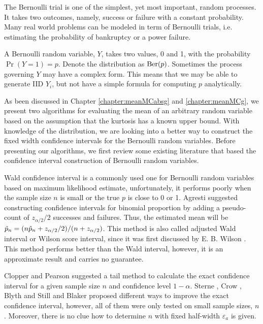 \documentclass{iitthesis}
\theoremstyle{definition}
\begin{document}
The Bernoulli trial is one of the simplest, yet most important, random processes. It takes two outcomes, namely, success or failure with a constant probability. Many real world problems can be modeled in term of Bernoulli trials, i.e. estimating the probability of bankruptcy or a power failure.

 A Bernoulli random variable, $Y$, takes two values, 0 and 1, with the probability $\Pr(Y=1) = p$. Denote the distribution as $ \operatorname{Ber}(p)$. Sometimes the process governing $Y$ may have a complex form. This means that we may be able to generate IID $Y_i$, but not have a simple formula for computing $p$ analytically. 

As been discussed in Chapter \ref{chapter:meanMCabsg} and \ref{chapter:meanMCg}, we present two algorithms for evaluating the mean of an arbitrary random variable based on the assumption that the kurtosis has a known upper bound. With knowledge of the distribution, we are looking into a better way to construct the fixed width confidence intervals for the Bernoulli random variables. Before presenting our algorithms, we first review some existing literature that based the confidence interval construction of Bernoulli random variables.

Wald confidence interval \cite[Section 1.3.3]{Agresti02} is a commonly used one for Bernoulli random variables based on maximum likelihood estimate, unfortunately, it performs poorly when the sample size $n$ is small or the true $p$ is close to 0 or 1. Agresti \cite[Section 1.4.2]{Agresti02} suggested constructing confidence intervals for binomial proportion by adding a pseudo-count of $z_{\alpha/2}/2$ successes and failures. Thus, the estimated mean will be $\tilde{p}_n =(n\hat{p}_n+z_{\alpha/2}/2) / (n+z_{\alpha/2})$. This method is also called adjusted Wald interval or Wilson score interval, since it was first discussed by E. B. Wilson \cite{wilson27}. This method performs better than the Wald interval, however, it is an approximate result and carries no guarantee.

Clopper and Pearson \cite{CP34} suggested a tail method to calculate the exact confidence interval for a given sample size $n$ and confidence level $1-\alpha$. Sterne \cite{sterne54}, Crow \cite{crow56}, Blyth and Still \cite{BS83} and Blaker \cite{Blaker00} proposed different ways to improve the exact confidence interval, however, all of them were only tested on small sample sizes, $n$.  Moreover, there is no clue how to determine $n$ with fixed half-width $\varepsilon_a$ is given. 
\end{document}
